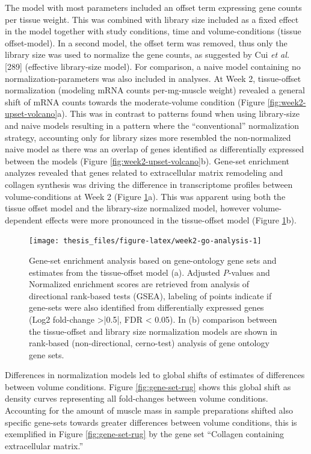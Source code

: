 \documentclass[twoside,10pt]{gihclass} %
\begin{document}
The model with most parameters included an offset term expressing gene counts per tissue weight. This was combined with library size included as a fixed effect in the model together with study conditions, time and volume-conditions (tissue offset-model).
In a second model, the offset term was removed, thus only the library size was used to normalize the gene counts, as suggested by Cui \emph{et al.}
{[}289{]} (effective library-size model).
For comparison, a naive model containing no normalization-parameters was also included in analyses.
At Week 2, tissue-offset normalization (modeling mRNA counts per-mg-muscle weight) revealed a general shift of mRNA counts towards the moderate-volume condition (Figure \ref{fig:week2-upset-volcano}a).
This was in contrast to patterns found when using library-size and naive models resulting in a pattern where the ``conventional'' normalization strategy, accounting only for library sizes more resembled the non-normalized naive model as there was an overlap of genes identified as differentially expressed between the models (Figure \ref{fig:week2-upset-volcano}b).
Gene-set enrichment analyzes revealed that genes related to extracellular matrix remodeling and collagen synthesis was driving the difference in transcriptome profiles between volume-conditions at Week 2
(Figure \ref{fig:week2-go-analysis}a).
This was apparent using both the tissue offset model and the library-size normalized model, however volume-dependent effects were more pronounced in the tissue-offset model
(Figure \ref{fig:week2-go-analysis}b).
\begin{figure}

{\centering \texttt{[image: thesis\_files/figure-latex/week2-go-analysis-1]} 

}

\caption[Gene-set enrichment analysis at Week 2]{Gene-set enrichment analysis based on gene-ontology gene sets and estimates from the tissue-offset model (a). Adjusted \textit{P}-values and Normalized enrichment scores are retrieved from analysis of directional rank-based tests (GSEA), labeling of points indicate if gene-sets were also identified from differentially expressed genes (Log2 fold-change >|0.5|, FDR < 0.05). In (b) comparison between the tissue-offset and library size normalization models are shown in rank-based (non-directional, cerno-test) analysis of gene ontology gene sets.}\label{fig:week2-go-analysis}
\end{figure}
Differences in normalization models led to global shifts of estimates of differences between volume conditions. Figure \ref{fig:gene-set-rug} shows this global shift as density curves representing all fold-changes between volume conditions. Accounting for the amount of muscle mass in sample preparations shifted also specific gene-sets towards greater differences between volume conditions, this is exemplified in Figure \ref{fig:gene-set-rug} by the gene set ``Collagen containing extracellular matrix.''
\end{document}
